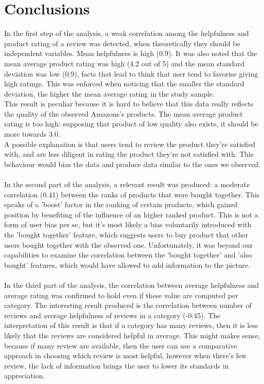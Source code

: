 \documentclass[11pt]{article}
\begin{document}
\section{Conclusions}
In the first step of the analysis, a weak correlation among the helpfulness and product rating of a review was detected, when theoretically they should be independent variables. Mean helpfulness is high (0.9). It was also noted that the mean average product rating was high (4.2 out of 5) and the mean standard deviation was low (0.9), facts that lead to think that user tend to favorise giving high ratings. This was enforced when noticing that the smaller the standard deviation, the higher the mean average rating in the study sample. \\
This result is peculiar because it is hard to believe that this data really reflects the quality of the observed Amazons's products. The mean average product rating is too high: supposing that product of low quality also exists, it should be more towards 3.0. 
\\A possible explanation is that users tend to review the product they're satisfied with, and are less diligent in rating the product they're not satisfied with. This behaviour would bias the data and produce data similar to the ones we observed.\\\\
In the second part of the analysis, a relevant result was produced: a moderate correlation (0.41) between the ranks of products that were bought together. This speaks of a 'boost' factor in the ranking of certain products, which gained position by benefiting of the influence of an higher ranked product. This is not a form of user bias per se, but it's most likely  a bias voluntarily introduced with the 'bought together' feature, which suggests users to buy product that other users bought together with the observed one. Unfortunately, it was beyond our capabilities to examine the correlation between the 'bought together' and  'also bought'  features, which would have allowed to add information to the picture.\\\\
In the third part of the analysis, the correlation between average helpfulness and average rating was confirmed to hold even if these value are computed per category. The interesting result produced is the correlation between number of reviews and average helpfulness of reviews in a category (-0.45). The interpretation of this result is that if a category has many reviews, then it is less likely that the reviews are considered helpful in average. This might makes sense, because if many review are available, then the user can use a comparative approach in choosing which review is most helpful, however when there's few review, the lack of information brings the user to lower its standards in appreciation. \\\\
\end{document}

